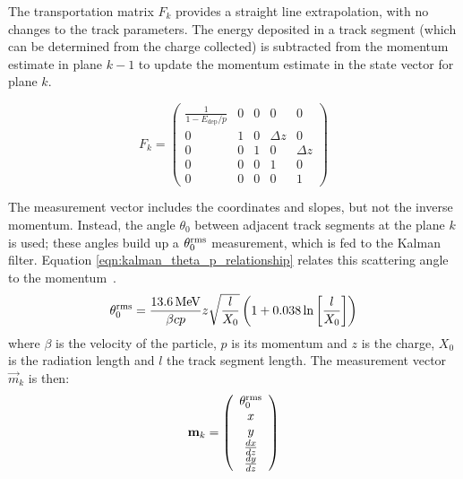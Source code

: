 The transportation matrix $F_k$ provides a straight line extrapolation, with no changes to the track parameters. The energy deposited in a track segment (which can be determined from the charge collected) is subtracted from the momentum estimate in plane $k-1$ to update the momentum estimate in the state vector for plane $k$.

\begin{equation}\label{eqn:kalman_transportation_matrix}
    F_k = \left( \begin{array}{ccccc}
    \frac{1}{1-E_{\mathrm{dep}}/p}  &   0   &   0   &   0       &   0       \\
    0                               &   1   &   0   & \Delta z  &   0       \\
    0                               &   0   &   1   &   0       & \Delta z  \\
    0                               &   0   &   0   &   1       &   0       \\
    0                               &   0   &   0   &   0       &   1
    \end{array} \right)
\end{equation}

The measurement vector includes the coordinates and slopes, but not the inverse momentum. Instead, the angle $\theta_0$ between adjacent track segments at the plane $k$ is used; these angles build up a $\theta_0^{\mathrm{rms}}$ measurement, which is fed to the Kalman filter. Equation \eqref{eqn:kalman_theta_p_relationship} relates this scattering angle to the momentum~\citep{Eidelman2004}.
\begin{equation}\label{eqn:kalman_theta_p_relationship}
    \theta_0^{\mathrm{rms}} = \frac{13.6\,\mathrm{MeV}}{\beta c p} z \sqrt{\frac{l}{X_0}} \left(1 + 0.038\ln\left[\frac{l}{X_0}\right]\right)
\end{equation}
where $\beta$ is the velocity of the particle, $p$ is its momentum and $z$ is the charge, $X_0$ is the radiation length and $l$ the track segment length. The measurement vector $\vec{m}_k$ is then:
\begin{equation}\label{eqn:kalman_measurement_vector}
    \mathbf{m}_k = \left( \begin{array}{c} \theta_0^{\mathrm{rms}} \\ x \\ y \\ \frac{dx}{dz} \\ \frac{dy}{dz} \end{array} \right)
\end{equation}

